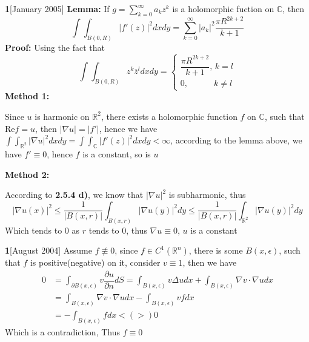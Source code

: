 \documentclass[../main.tex]{subfiles}
\begin{document}
\begin{customproblem}\textbf{1}[January 2005]
\textbf{Lemma:} If $\displaystyle{g=\sum_{k=0}^{\infty}a_{k}z^{k}}$ is a holomorphic fuction on $\mathbb{C}$, then
\[
\int\int_{B(0,R)}|f'(z)|^{2}dxdy=\sum_{k=0}^{\infty}|a_{k}|^{2}\dfrac{\pi R^{2k+2}}{k+1}
\]
\textbf{Proof:} Using the fact that $$\int\int_{B(0,R)}z^{k}\overline{z}^{l}dxdy=
\left\{\begin{matrix}
\dfrac{\pi R^{2k+2}}{k+1}, \,k=l \\ 
0, \qquad\quad k\neq l
\end{matrix}\right.
$$
\textbf{Method 1:} \par
Since $u$ is harmonic on $\mathbb{R}^{2}$, there exists a holomorphic function $f$ on $\mathbb{C}$, such that $\mathrm{Re}f=u$, then $|\nabla u|=|f'|$, hence we have $\displaystyle{
\int\int_{\mathbb{R}^{2}}|\nabla u|^{2}dxdy=\int\int_{\mathbb{C}}|f'(z)|^{2}dxdy < \infty
}$, according to the lemma above, we have $f'\equiv 0$, hence $f$ is a constant, so is $u$ \par
\textbf{Method 2:} \par
According to \textbf{2.5.4 d)}, we know that $|\nabla u|^{2}$ is subharmonic, thus 
$$|\nabla u(x)|^{2} \leq \dfrac{1}{|B(x,r)|}\int_{B(x,r)}|\nabla u(y)|^{2}dy \leq\dfrac{1}{|B(x,r)|}\int_{\mathbb{R}^{2}}|\nabla u(y)|^{2}dy$$Which tends to $0$ as $r$ tends  to $0$, thus $\nabla u \equiv 0$, $u$ is a constant
\end{customproblem}

\begin{customproblem}\textbf{1}[August 2004]
Assume $f\not\equiv  0$, since $f\in C^{1}(\mathbb{R}^{n})$, there is some $B(x,\epsilon)$, such that $f$ is positive(negative) on it, consider $v\equiv 1$, then we have$$
\begin{aligned}
0 &=\int_{\partial B(x,\epsilon)}v\dfrac{\partial u}{\partial n} dS = \int_{B(x,\epsilon)}v\Delta udx + \int_{B(x,\epsilon)}\nabla v\cdot\nabla udx \\
&= \int_{B(x,\epsilon)}\nabla v\cdot\nabla udx - \int_{B(x,\epsilon)}vfdx \\
&= -\int_{B(x,\epsilon)}fdx <(>) 0
\end{aligned}
$$ Which is a contradiction, Thus $f\equiv 0$
\end{customproblem}
\end{document}
